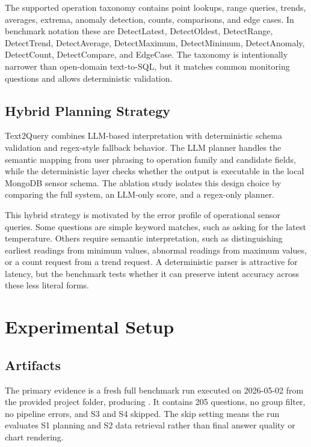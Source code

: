 \documentclass[11pt]{article}
\begin{document}
The supported operation taxonomy contains point lookups, range queries, trends, averages, extrema, anomaly detection, counts, comparisons, and edge cases. In benchmark notation these are DetectLatest, DetectOldest, DetectRange, DetectTrend, DetectAverage, DetectMaximum, DetectMinimum, DetectAnomaly, DetectCount, DetectCompare, and EdgeCase. The taxonomy is intentionally narrower than open-domain text-to-SQL, but it matches common monitoring questions and allows deterministic validation.

\subsection{Hybrid Planning Strategy}

Text2Query combines LLM-based interpretation with deterministic schema validation and regex-style fallback behavior. The LLM planner handles the semantic mapping from user phrasing to operation family and candidate fields, while the deterministic layer checks whether the output is executable in the local MongoDB sensor schema. The ablation study isolates this design choice by comparing the full system, an LLM-only score, and a regex-only planner.

This hybrid strategy is motivated by the error profile of operational sensor queries. Some questions are simple keyword matches, such as asking for the latest temperature. Others require semantic interpretation, such as distinguishing earliest readings from minimum values, abnormal readings from maximum values, or a count request from a trend request. A deterministic parser is attractive for latency, but the benchmark tests whether it can preserve intent accuracy across these less literal forms.

\section{Experimental Setup}

\subsection{Artifacts}

The primary evidence is a fresh full benchmark run executed on 2026-05-02 from the provided project folder, producing . It contains 205 questions, no group filter, no pipeline errors, and S3 and S4 skipped. The skip setting means the run evaluates S1 planning and S2 data retrieval rather than final answer quality or chart rendering.
\end{document}
